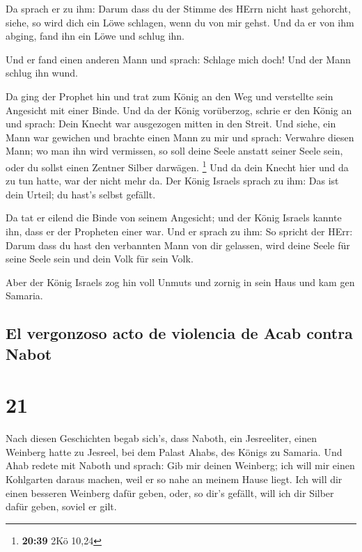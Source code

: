  Da sprach er zu ihm: Darum dass du der Stimme des HErrn
nicht hast gehorcht, siehe, so wird dich ein Löwe schlagen, wenn du von
mir gehst. Und da er von ihm abging, fand ihn ein Löwe und schlug ihn.

 Und er fand einen anderen Mann und sprach: Schlage mich
doch! Und der Mann schlug ihn wund.

 Da ging der Prophet hin und trat zum König an den Weg
und verstellte sein Angesicht mit einer Binde.  Und da
der König vorüberzog, schrie er den König an und sprach: Dein Knecht war
ausgezogen mitten in den Streit. Und siehe, ein Mann war gewichen und
brachte einen Mann zu mir und sprach: Verwahre diesen Mann; wo man ihn
wird vermissen, so soll deine Seele anstatt seiner Seele sein, oder du
sollst einen Zentner Silber darwägen. \footnote{\textbf{20:39} 2Kö 10,24}
 Und da dein Knecht hier und da zu tun hatte, war der
nicht mehr da. Der König Israels sprach zu ihm: Das ist dein Urteil; du
hast's selbst gefällt.

 Da tat er eilend die Binde von seinem Angesicht; und der
König Israels kannte ihn, dass er der Propheten einer war.
 Und er sprach zu ihm: So spricht der HErr: Darum dass du
hast den verbannten Mann von dir gelassen, wird deine Seele für seine
Seele sein und dein Volk für sein Volk.

 Aber der König Israels zog hin voll Unmuts und zornig in
sein Haus und kam gen Samaria.

\hypertarget{el-vergonzoso-acto-de-violencia-de-acab-contra-nabot}{%
\subsection{El vergonzoso acto de violencia de Acab contra
Nabot}\label{el-vergonzoso-acto-de-violencia-de-acab-contra-nabot}}

\hypertarget{section-20}{%
\section{21}\label{section-20}}

 Nach diesen Geschichten begab sich's, dass Naboth, ein
Jesreeliter, einen Weinberg hatte zu Jesreel, bei dem Palast Ahabs, des
Königs zu Samaria.  Und Ahab redete mit Naboth und sprach:
Gib mir deinen Weinberg; ich will mir einen Kohlgarten daraus machen,
weil er so nahe an meinem Hause liegt. Ich will dir einen besseren
Weinberg dafür geben, oder, so dir's gefällt, will ich dir Silber dafür
geben, soviel er gilt.

